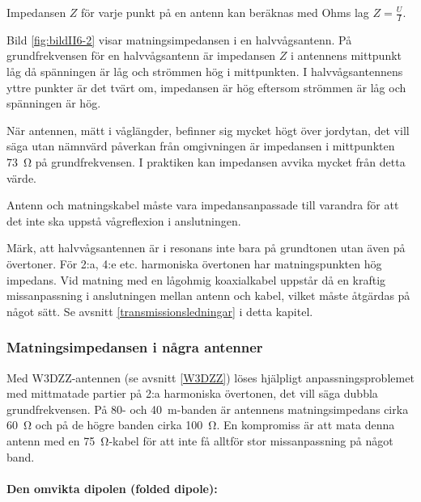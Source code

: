 
Impedansen \(Z\) för varje punkt på en antenn kan beräknas med Ohms lag
\(Z = \frac{U}{I}\).

Bild \ref{fig:bildII6-2} visar matningsimpedansen i en halvvågsantenn.
På grundfrekvensen för en halvvågsantenn är impedansen \(Z\) i antennens
mittpunkt låg då spänningen är låg och strömmen hög i mittpunkten.
I halvvågsantennens yttre punkter är det tvärt om, impedansen är hög eftersom
strömmen är låg och spänningen är hög.

När antennen, mätt i våglängder, befinner sig mycket högt över jordytan, det
vill säga utan nämnvärd påverkan från omgivningen är impedansen i mittpunkten
\SI{73}{\ohm} på grundfrekvensen.
I praktiken kan impedansen avvika mycket från detta värde.

Antenn och matningskabel måste vara impedansanpassade till varandra
för att det inte ska uppstå vågreflexion i anslutningen.

Märk, att halvvågsantennen är i resonans inte bara på grundtonen utan även på
övertoner.
För 2:a, 4:e etc. harmoniska övertonen har matningspunkten hög impedans.
Vid matning med en lågohmig koaxialkabel uppstår då en kraftig missanpassning i
anslutningen mellan antenn och kabel, vilket måste åtgärdas på något sätt.
Se avsnitt \ref{transmissionsledningar} i detta kapitel.

\subsubsection{Matningsimpedansen i några antenner}

Med W3DZZ-antennen (se avsnitt \ref{W3DZZ}) löses hjälpligt anpassningsproblemet
med mittmatade partier på 2:a harmoniska övertonen, det vill säga dubbla
grundfrekvensen.
På 80- och 40~m-banden är antennens matningsimpedans cirka \SI{60}{\ohm} och på de
högre banden cirka \SI{100}{\ohm}.
En kompromiss är att mata denna antenn med en \SI{75}{\ohm}-kabel för att inte
få alltför stor missanpassning på något band.

\paragraph{Den omvikta dipolen (folded dipole):}

